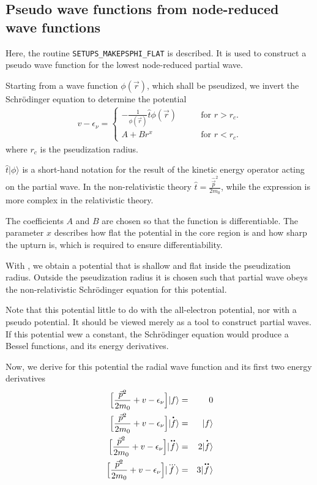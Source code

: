 \documentclass[11pt,a4paper]{report}
\begin{document}
\subsection{Pseudo wave functions from node-reduced wave functions}
\label{sec:determinedeltepseudo}
Here, the routine \verb|SETUPS_MAKEPSPHI_FLAT| is described. It is used
to construct a pseudo wave function for the lowest node-reduced
partial wave.

Starting from a wave function $\phi(\vec{r})$, which shall be
pseudized, we invert the Schr\"odinger equation to determine the potential
\begin{eqnarray}
v-\epsilon_\nu=
\begin{cases}
-\frac{1}{\phi(\vec{r})}\hat{t}\phi(\vec{r})&\qquad\text{for $r>r_c$.}
\\
A+Br^x&\qquad\text{for $r<r_c$.}
\end{cases}
\label{eq:invertschrgl}
\end{eqnarray}
where $r_c$ is the pseudization radius. 

$\hat{t}|\phi\rangle$ is a short-hand notation for the
result of the kinetic energy operator acting on the partial wave. In
the non-relativistic theory $\hat{t}=\frac{\hat{\vec{p}}^2}{2m_0}$,
while the expression is more complex in the relativistic theory.

The coefficients $A$ and $B$
are chosen so that the function is differentiable. The parameter $x$
describes how flat the potential in the core region is and how sharp
the upturn is, which is required to ensure differentiability.

With , we obtain a potential that is shallow and
flat inside the pseudization radius. Outside the pseudization radius
it is chosen such that partial wave obeys the non-relativistic
Schr\"odinger equation for this potential.

Note that this potential little to do with the all-electron potential,
nor with a pseudo potential. It should be viewed merely as a tool to
construct partial waves. If this potential wew a constant, the
Schr\"odinger equation would produce a Bessel functions, and its
energy derivatives. 

Now, we derive for this potential the radial wave function and its
first two energy derivatives
\begin{eqnarray}
\Bigl[\frac{\vec{p}^2}{2m_0}+v-\epsilon_\nu\Bigr]|f\rangle&=&0
\nonumber\\
\Bigl[\frac{\vec{p}^2}{2m_0}+v-\epsilon_\nu\Bigr]|\dot{f}\rangle&=&|f\rangle
\nonumber\\
\Bigl[\frac{\vec{p}^2}{2m_0}+v-\epsilon_\nu\Bigr]|\ddot{f}\rangle
&=&2|\dot{f}\rangle
\nonumber\\
\Bigl[\frac{\vec{p}^2}{2m_0}+v-\epsilon_\nu\Bigr]|\dddot{f}\rangle
&=&3|\ddot{f}\rangle
\end{eqnarray}
\end{document}
